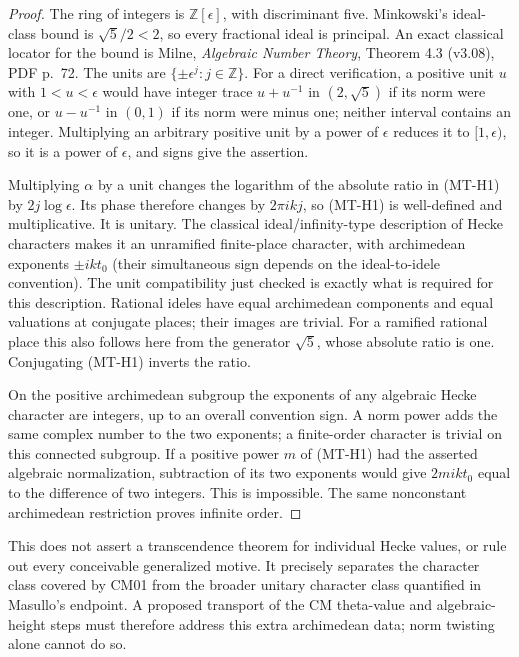 \documentclass[11pt,a4paper]{article}
\begin{document}
\begin{proof}
The ring of integers is $\mathbb Z[\epsilon]$, with discriminant five.
Minkowski's ideal-class bound is $\sqrt5/2<2$, so every fractional
ideal is principal. An exact classical locator for the bound is
Milne, \emph{Algebraic Number Theory}, Theorem 4.3 (v3.08), PDF p.~72.
The units are $\{\pm\epsilon^j:j\in\mathbb Z\}$. For a direct
verification, a positive unit $u$ with $1<u<\epsilon$ would have
integer trace $u+u^{-1}$ in $(2,\sqrt5)$ if its norm were one, or
$u-u^{-1}$ in $(0,1)$ if its norm were minus one; neither interval
contains an integer. Multiplying an arbitrary positive unit by a
power of $\epsilon$ reduces it to $[1,\epsilon)$, so it is a power
of $\epsilon$, and signs give the assertion.

Multiplying $\alpha$ by a unit changes the logarithm of the absolute
ratio in (MT-H1) by $2j\log\epsilon$. Its phase therefore changes by
$2\pi i k j$, so (MT-H1) is well-defined and multiplicative. It is
unitary. The classical ideal/infinity-type description of Hecke
characters makes it an unramified finite-place character, with
archimedean exponents $\pm ikt_0$ (their simultaneous sign depends
on the ideal-to-idele convention). The unit compatibility just checked
is exactly what is required for this description. Rational ideles
have equal archimedean components and equal valuations at conjugate
places; their images are trivial. For a ramified rational place this
also follows here from the generator $\sqrt5$, whose absolute ratio
is one. Conjugating (MT-H1) inverts the ratio.

On the positive archimedean subgroup the exponents of any algebraic
Hecke character are integers, up to an overall convention sign.
A norm power adds the same complex number to the two exponents;
a finite-order character is trivial on this connected subgroup.
If a positive power $m$ of (MT-H1) had the asserted algebraic
normalization, subtraction of its two exponents would give
$2mikt_0$ equal to the difference of two integers. This is impossible.
The same nonconstant archimedean restriction proves infinite order.
\end{proof}

This does not assert a transcendence theorem for individual Hecke
values, or rule out every conceivable generalized motive. It precisely
separates the character class covered by CM01 from the broader unitary
character class quantified in Masullo's endpoint. A proposed transport
of the CM theta-value and algebraic-height steps must therefore address
this extra archimedean data; norm twisting alone cannot do so.
\end{document}
